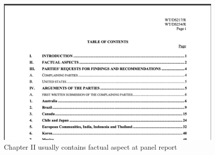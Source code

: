\begin{figure}[h]
    \centering
    \includegraphics[scale=0.3]{Data/pngs/panel_report_toc.png}
    \caption{Chapter II usually contains factual aspect at panel report}
\end{figure}

